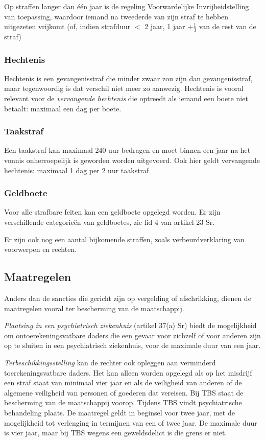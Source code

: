 \documentclass{article}
\begin{document}
Op straffen langer dan \'e\'en jaar is de regeling Voorwardelijke
Invrijheidstelling van toepassing, waardoor iemand na tweederde van zijn straf
te hebben uitgezeten vrijkomt (of, indien strafduur $<$ 2 jaar, 1 jaar
$+\frac{1}{3}$ van de rest van de straf)

\subsubsection{Hechtenis}

Hechtenis is een gevangenisstraf die minder zwaar zou zijn dan gevangenisstraf,
maar tegenwoordig is dat verschil niet meer zo aanwezig. Hechtenis is vooral
relevant voor de \emph{vervangende hechtenis} die optreedt als iemand een boete
niet betaalt: maximaal een dag per  boete.

\subsubsection{Taakstraf}

Een taakstraf kan maximaal 240 uur bedragen en moet binnen een jaar na het vonnis
onherroepelijk is geworden worden uitgevoerd. Ook hier geldt vervangende hechtenis:
maximaal 1 dag per 2 uur taakstraf.

\subsubsection{Geldboete}

Voor alle strafbare feiten kan een geldboete opgelegd worden. Er zijn verschillende
categorie\"en van geldboetes, zie lid 4 van artikel 23 Sr.

Er zijn ook nog een aantal bijkomende straffen, zoals verbeurdverklaring van voorwerpen
en rechten.

\subsection{Maatregelen}

Anders dan de sancties die gericht zijn op vergelding of afschrikking, dienen
de maatregelen vooral ter bescherming van de maatschappij.

\emph{Plaatsing in een psychiatrisch ziekenhuis} (artikel 37(a) Sr) biedt de
mogelijkheid om ontoerekeningsvatbare daders die een gevaar voor zichzelf of
voor anderen zijn op te sluiten in een psychiatrisch ziekenhuis, voor de
maximale duur van een jaar.

\emph{Terbeschikkingsstelling} kan de rechter ook opleggen aan verminderd
toerekeningsvatbare daders. Het kan alleen worden opgelegd als op het misdrijf
een straf staat van minimaal vier jaar en als de veiligheid van anderen of de
algemene veiligheid van personen of goederen dat vereisen. Bij TBS staat de
bescherming van de maatschappij voorop. Tijdens TBS vindt psychiatrische
behandeling plaats. De maatregel geldt in beginsel voor twee jaar, met de
mogelijkheid tot verlenging in termijnen van een of twee jaar. De maximale duur
is vier jaar, maar bij TBS wegens een geweldsdelict is die grens er niet.
\end{document}
